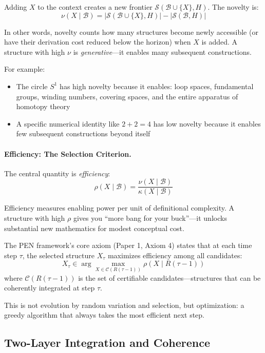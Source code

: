 \documentclass[11pt]{article}
\theoremstyle{definition}
\begin{document}
Adding $X$ to the context creates a new frontier $\mathcal{S}(\mathcal{B} \cup \{X\}, H)$. The novelty is:
\[
\nu(X \mid \mathcal{B}) = |\mathcal{S}(\mathcal{B} \cup \{X\}, H)| - |\mathcal{S}(\mathcal{B}, H)|
\]

In other words, novelty counts how many structures become newly accessible (or have their derivation cost reduced below the horizon) when $X$ is added. A structure with high $\nu$ is \emph{generative}—it enables many subsequent constructions.

For example:
\begin{itemize}
\item The circle $S^1$ has high novelty because it enables: loop spaces, fundamental groups, winding numbers, covering spaces, and the entire apparatus of homotopy theory
\item A specific numerical identity like $2 + 2 = 4$ has low novelty because it enables few subsequent constructions beyond itself
\end{itemize}

\paragraph{Efficiency: The Selection Criterion.}

The central quantity is \emph{efficiency}:
\[
\rho(X \mid \mathcal{B}) = \frac{\nu(X \mid \mathcal{B})}{\kappa(X \mid \mathcal{B})}
\]

Efficiency measures enabling power per unit of definitional complexity. A structure with high $\rho$ gives you ``more bang for your buck''—it unlocks substantial new mathematics for modest conceptual cost.

The PEN framework's core axiom (Paper 1, Axiom 4) states that at each time step $\tau$, the selected structure $X_\tau$ maximizes efficiency among all candidates:
\[
X_\tau \in \arg\max_{X \in \mathcal{C}(R(\tau-1))} \rho(X \mid R(\tau-1))
\]
where $\mathcal{C}(R(\tau-1))$ is the set of certifiable candidates—structures that can be coherently integrated at step $\tau$.

This is not evolution by random variation and selection, but optimization: a greedy algorithm that always takes the most efficient next step.

\subsection{Two-Layer Integration and Coherence}
\end{document}
